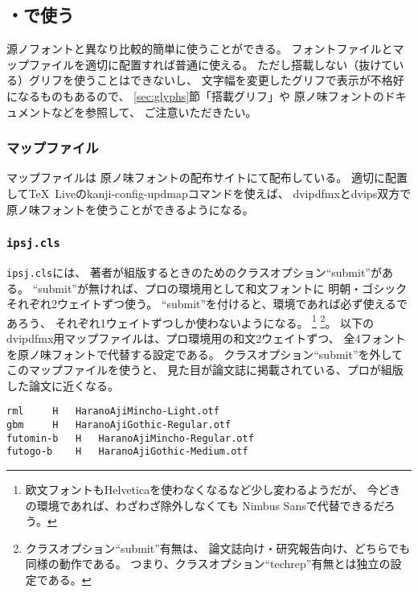 \subsection{\pTeX ・\upTeX で使う}

源ノフォントと異なり比較的簡単に使うことができる。
フォントファイルとマップファイルを適切に配置すれば普通に使える。
ただし搭載しない（抜けている）グリフを使うことはできないし、
文字幅を変更したグリフで表示が不格好になるものもあるので、
\ref{sec:glyphs}節「搭載グリフ」や
原ノ味フォントのドキュメントなどを参照して、
ご注意いただきたい。

\subsubsection{マップファイル}

マップファイルは
原ノ味フォントの配布サイト\cite{haranoaji}にて配布している。
適切に配置して\TeX \ Liveのkanji-config-updmapコマンドを使えば、
dvipdfmxとdvips双方で原ノ味フォントを使うことができるようになる。

\subsubsection{\texttt{ipsj.cls}}

\texttt{ipsj.cls}には、
著者が組版するときのためのクラスオプション``submit''がある。
``submit''が無ければ、プロの環境用として和文フォントに
明朝・ゴシックそれぞれ2ウェイトずつ使う。
``submit''を付けると、\pTeX 環境であれば必ず使えるであろう、
それぞれ1ウェイトずつしか使わないようになる。
\footnote{欧文フォントもHelveticaを使わなくなるなど少し変わるようだが、
  今どきの環境であれば、わざわざ除外しなくても
  Nimbus Sansで代替できるだろう。}%
\footnote{クラスオプション``submit''有無は、
  論文誌向け・研究報告向け、どちらでも同様の動作である。
  つまり、クラスオプション``techrep''有無とは独立の設定である。}。
以下のdvipdfmx用マップファイルは、プロ環境用の和文2ウェイトずつ、
全4フォントを原ノ味フォントで代替する設定である。
クラスオプション``submit''を外してこのマップファイルを使うと、
見た目が論文誌に掲載されている、プロが組版した論文に近くなる。

\begin{tcolorbox}[left=0mm,right=0mm,top=0mm,bottom=0mm]
\begin{lstlisting}
rml		H	HaranoAjiMincho-Light.otf
gbm		H	HaranoAjiGothic-Regular.otf
futomin-b	H	HaranoAjiMincho-Regular.otf
futogo-b	H	HaranoAjiGothic-Medium.otf
\end{lstlisting}
\end{tcolorbox}

